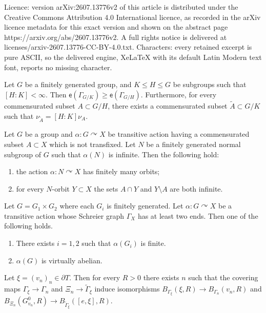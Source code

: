 \documentclass[10pt,a4paper]{amsart}
\newcommand{\Gammatilde}{\ensuremath{\widetilde{\Gamma}}}%
\newcommand{\acts}{\ensuremath{\curvearrowright}}%
\newcommand{\arr}{\longrightarrow}
\newcommand{\esf}{\ensuremath{\mathsf{e}}}
\begin{document}
Licence: version arXiv:2607.13776v2 of this article is distributed under the Creative Commons Attribution 4.0 International licence, as recorded in the arXiv licence metadata for this exact version and shown on the abstract page https://arxiv.org/abs/2607.13776v2. A full rights notice is delivered at licenses/arxiv-2607.13776-CC-BY-4.0.txt. Characters: every retained excerpt is pure ASCII, so the delivered engine, XeLaTeX with its default Latin Modern text font, reports no missing character.
\begin{lemma}
\label{lem:endsofcoverings}
Let $G$ be a finitely generated group, and $K\le H\le G$ be subgroups such  that $[H:K]<\infty$. Then $\esf(\Gamma_{G/K})\ge \esf(\Gamma_{G/H})$. Furthermore, for every commensurated subset $A\subset G/H$, there exists a commensurated subset $\widetilde{A}\subset G/K$ such that $\nu_{\widetilde{A}}=[H: K] \nu_A$. 


\end{lemma}

\begin{lemma} \label{l-reduction-transitive}
	Let $G$ be a group and  $\alpha \colon G\acts X$  be transitive action having a commensurated subset $A\subset X$ which is not transfixed. Let $N$ be a finitely generated normal subgroup of $G$ such that $\alpha(N)$ is infinite. Then the following hold:
	\begin{enumerate}
	
	\item the action $\alpha \colon N \acts X$ has finitely many orbits;
	\item	 for every $N$-orbit $Y\subset X$ the sets $A\cap Y$ and $Y\setminus A$ are both infinite.\end{enumerate}	\end{lemma}

	\begin{thm} \label{t-commensurating-product-discrete}
	Let $G=G_1\times G_2$ where each $G_i$ is  finitely generated. Let $\alpha \colon G\acts X$ be a transitive action whose Schreier graph $\Gamma_X$ has at least two ends. Then  one of the following holds.
	\begin{enumerate}[label=(\roman*)]
	\item There exists $i=1, 2$ such that $\alpha(G_i)$ is finite. 
	\item   $\alpha(G)$ is virtually abelian.  
	\end{enumerate}
	\end{thm}

\begin{prop}
\label{pr:convergenceofgraphs}
 Let $\xi=(v_n)_n\in\partial T$. Then for every $R>0$ there exists $n$ such that the covering maps $\Gamma_\xi\arr\Gamma_n$ and $\Xi_n\arr\Gammatilde_\xi$ induce isomorphisms $B_{\Gamma_\xi}(\xi, R)\arr B_{\Gamma_n}(v_n, R)$ and $B_{\Xi_n}(G^0_{v_n}, R)\arr B_{\Gammatilde_\xi}([e,\xi], R)$.
\end{prop}
\end{document}
